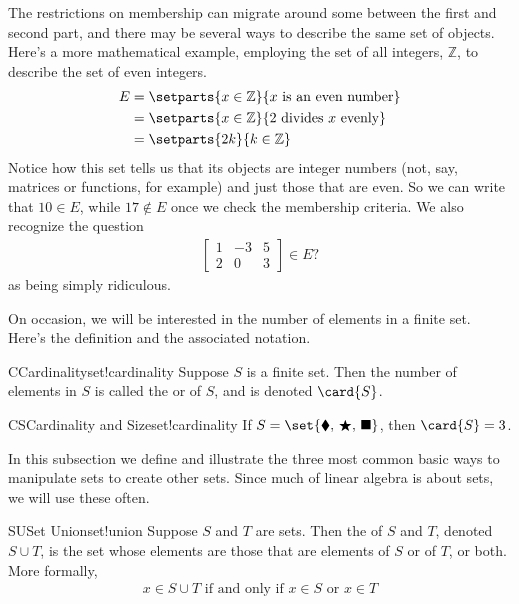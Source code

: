 %
The restrictions on membership can migrate around some between the first and second part, and there may be several ways to describe the same set of objects.  Here's a more mathematical example, employing the set of all integers, ${\mathbb Z}$, to describe the set of even integers.
%
\begin{align*}
E
&=\setparts{x\in{\mathbb Z}}{x\text{ is an even number}}\\
&=\setparts{x\in{\mathbb Z}}{2\text{ divides }x\text{ evenly}}\\
&=\setparts{2k}{k\in{\mathbb Z}}
\end{align*}
%
Notice how this set tells us that its objects are integer numbers (not, say, matrices or functions, for example) and just those that are even.  So we can write that $10\in E$, while $17\not\in E$ once we check the membership criteria.  We also recognize the question
%
\begin{align*}
\begin{bmatrix}
1&-3&5\\
2&0&3
\end{bmatrix}
\in E\text{?}
\end{align*}
%
as being simply ridiculous.\par
%
%
On occasion, we will be interested in the number of elements in a finite set.  Here's the definition and the associated notation.
%
\begin{definition}{C}{Cardinality}{set!cardinality}
Suppose $S$ is a finite set.  Then the number of elements in $S$ is called the  or  of $S$, and is denoted $\card{S}$.
%
\end{definition}
%
\begin{example}{CS}{Cardinality and Size}{set!cardinality}
If $S=\set{\blacklozenge,\,\bigstar,\,\blacksquare}$, then $\card{S}=3$.
\end{example}
%
%
In this subsection we define and illustrate the three most common basic ways to manipulate sets to create other sets.  Since much of linear algebra is about sets, we will use these often.
%
\begin{definition}{SU}{Set Union}{set!union}
Suppose $S$ and $T$ are sets.  Then the  of $S$ and $T$, denoted $S\cup T$, is the set whose elements are those that are elements of $S$ or of $T$, or both.  More formally,
%
\begin{align*}
x\in S\cup T\text{ if and only if }x\in S\text{ or }x\in T
\end{align*}
%
\end{definition}

